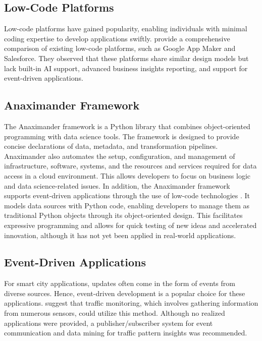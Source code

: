 \subsection{Low-Code Platforms}
 Low-code platforms have gained popularity, enabling individuals with minimal coding expertise to develop applications swiftly. \citet{sahay2020supporting} provide a comprehensive comparison of existing low-code platforms, such as Google App Maker and Salesforce. They observed that these platforms share similar design models but lack built-in AI support, advanced business insights reporting, and support for event-driven applications.

\subsection{Anaximander Framework}
 The Anaximander framework is a Python library that combines object-oriented programming with data science tools. The framework is designed to provide concise declarations of data, metadata, and transformation pipelines. Anaximander also automates the setup, configuration, and management of infrastructure, software, systems, and the resources and services required for data access in a cloud environment. This allows developers to focus on business logic and data science-related issues. In addition, the Anaximander framework supports event-driven applications through the use of low-code technologies \autocite{jd2021anaximander}. It models data sources with Python code, enabling developers to manage them as traditional Python objects through its object-oriented design. This facilitates expressive programming and allows for quick testing of new ideas and accelerated innovation, although it has not yet been applied in real-world applications.

\subsection{Event-Driven Applications}
 For smart city applications, updates often come in the form of events from diverse sources. Hence, event-driven development is a popular choice for these applications. \citet{hinze2009event} suggest that traffic monitoring, which involves gathering information from numerous sensors, could utilize this method. Although no realized applications were provided, a publisher/subscriber system for event communication and data mining for traffic pattern insights was recommended.

